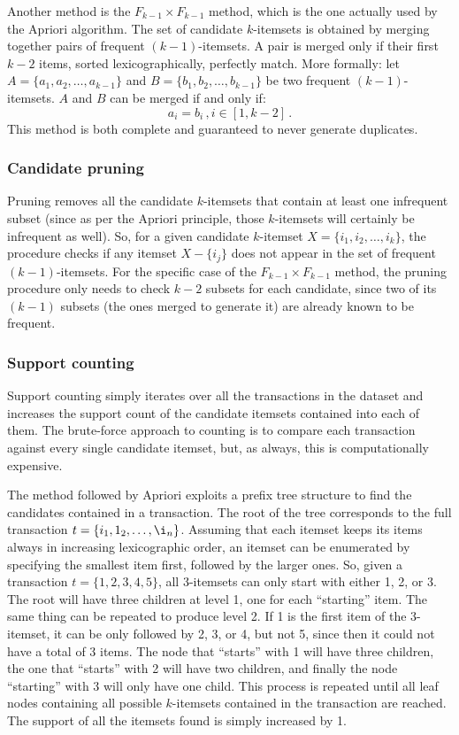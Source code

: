Another method is the $F_{k-1} \times F_{k-1}$ method, which is the one actually used by the Apriori algorithm. The set of candidate $k$-itemsets is obtained by merging together pairs of frequent $(k-1)$-itemsets. A pair is merged only if their first $k-2$ items, sorted lexicographically, perfectly match. More formally: let $A = \{ a_1, a_2, \dots, a_{k-1} \}$ and $B = \{ b_1, b_2, \dots, b_{k-1} \}$ be two frequent $(k-1)$-itemsets. $A$ and $B$ can be merged if and only if:
\begin{equation*}
    a_i = b_i \,, i \in [1,k-2] \,.
\end{equation*}
This method is both complete and guaranteed to never generate duplicates.

\subsubsection{Candidate pruning}

Pruning removes all the candidate $k$-itemsets that contain at least one infrequent subset (since as per the Apriori principle, those $k$-itemsets will certainly be infrequent as well). So, for a given candidate $k$-itemset $X = \{ i_1, i_2, \dots, i_k \}$, the procedure checks if any itemset $X - \{i_j\}$ does not appear in the set of frequent $(k-1)$-itemsets. For the specific case of the $F_{k-1} \times F_{k-1}$ method, the pruning procedure only needs to check $k-2$ subsets for each candidate, since two of its $(k-1)$ subsets (the ones merged to generate it) are already known to be frequent.

\subsubsection{Support counting} 

Support counting simply iterates over all the transactions in the dataset and increases the support count of the candidate itemsets contained into each of them. The brute-force approach to counting is to compare each transaction against every single candidate itemset, but, as always, this is computationally expensive.

The method followed by Apriori exploits a prefix tree structure to find the candidates contained in a transaction. The root of the tree corresponds to the full transaction $t = \{ i_1, 1_2, \dots, \i_n \}$. Assuming that each itemset keeps its items always in increasing lexicographic order, an itemset can be enumerated by specifying the smallest item first, followed by the larger ones. So, given a transaction $t = \{ 1, 2, 3, 4, 5 \}$, all 3-itemsets can only start with either 1, 2, or 3. The root will have three children at level 1, one for each ``starting'' item. The same thing can be repeated to produce level 2. If 1 is the first item of the 3-itemset, it can be only followed by 2, 3, or 4, but not 5, since then it could not have a total of 3 items. The node that ``starts'' with 1 will have three children, the one that ``starts'' with 2 will have two children, and finally the node ``starting'' with 3 will only have one child. This process is repeated until all leaf nodes containing all possible $k$-itemsets contained in the transaction are reached. The support of all the itemsets found is simply increased by 1.

